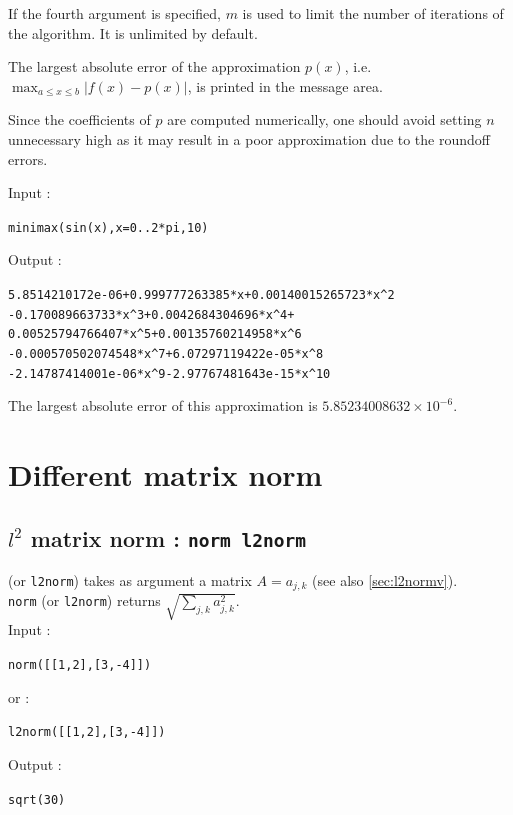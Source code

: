 \documentclass[a4paper,11pt]{book}
\begin{document}
If the fourth argument is specified, $ m $ is used to limit the number of iterations of the algorithm. It is unlimited by default.

The largest absolute error of the approximation $ p(x) $, i.e.~$ \max_{a\leq x\leq b}|f(x)-p(x)| $, is printed in the message area.

Since the coefficients of $ p $ are computed numerically, one should avoid setting $ n $ unnecessary high as it may result in a poor approximation due to the roundoff errors.

\noindent Input :
\begin{center}
{\tt minimax(sin(x),x=0..2*pi,10)}
\end{center}
Output :
\begin{center}
{\tt 5.8514210172e-06+0.999777263385*x+0.00140015265723*x\verb|^|2}\\
{\tt -0.170089663733*x\verb|^|3+0.0042684304696*x\verb|^|4+}\\
{\tt 0.00525794766407*x\verb|^|5+0.00135760214958*x\verb|^|6}\\
{\tt -0.000570502074548*x\verb|^|7+6.07297119422e-05*x\verb|^|8}\\
{\tt -2.14787414001e-06*x\verb|^|9-2.97767481643e-15*x\verb|^|10}
\end{center}
The largest absolute error of this approximation is $ 5.85234008632\times 10^{-6} $.


\section{Different matrix norm}
\subsection{$l^2$ matrix norm : {\tt norm l2norm}}\label{sec:l2normm}
 (or {\tt l2norm}) takes as argument a matrix $A=a_{j,k}$ 
(see also \ref{sec:l2normv}).\\
{\tt norm} (or {\tt l2norm}) returns 
$\displaystyle \sqrt{\sum_{j,k} a_{j,k}^2}$.\\
Input :
\begin{center}{\tt norm([[1,2],[3,-4]])}\end{center}
or :
\begin{center}{\tt l2norm([[1,2],[3,-4]])}\end{center}
Output :
\begin{center}{\tt sqrt(30)}\end{center}
\end{document}
